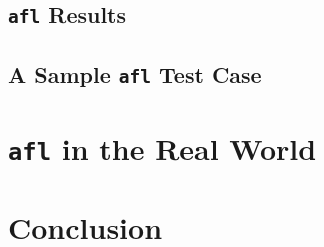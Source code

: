 \subsection{\texttt{afl} Results}


\subsection{A Sample \texttt{afl} Test Case}


\section{\texttt{afl} in the Real World}



\section{Conclusion}

